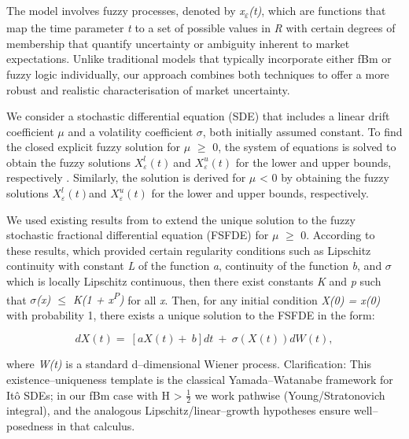\documentclass[12pt,a4paper]{report}
\numberwithin{equation}{section}
\begin{document}
The model involves fuzzy processes, denoted by
\emph{x\textsubscript{$\varepsilon$}(t)}, which are functions that map the time
parameter \emph{t} to a set of possible values in \emph{R} with certain
degrees of membership that quantify uncertainty or ambiguity inherent to
market expectations. Unlike traditional models that typically
incorporate either fBm or fuzzy logic individually, our approach
combines both techniques to offer a more robust and realistic
characterisation of market uncertainty.

We consider a stochastic differential equation (SDE) that includes a
linear drift coefficient \emph{$\mu$} and a volatility coefficient \emph{$\sigma$},
both initially assumed constant. To find the closed explicit fuzzy
solution for \emph{$\mu$} $\geq$ 0, the system of equations is solved to obtain
the fuzzy solutions \(X_{\varepsilon}^{l}(t)\ \)and
\(X_{\varepsilon}^{u}(t)\) for the lower and upper bounds, respectively
\cite{jafari2021fuzzy_81}. Similarly, the solution is derived for $\mu$ \textless{} 0 by
obtaining the fuzzy solutions \(X_{\varepsilon}^{l}(t)\)and
\(X_{\varepsilon}^{u}(t)\) for the lower and upper bounds, respectively.

We used existing results from \cite{llendeto2007modeling_82} \cite{bjrk2009arbitrage_89} to extend the unique
solution to the fuzzy stochastic fractional differential equation
(FSFDE) for \emph{$\mu$} $\geq$ 0. According to these results, which provided
certain regularity conditions such as Lipschitz continuity with constant
\emph{L} of the function \emph{a}, continuity of the function \emph{b},
and \emph{$\sigma$} which is locally Lipschitz continuous, then there exist
constants \emph{K} and \emph{p} such that
\emph{\textbar\textbar $\sigma$(x)\textbar\textbar{} $\leq$ K(1 +
\textbar\textbar x\textbar\textbar{}\textsuperscript{P})} for all
\emph{x}. Then, for any initial condition \emph{X(0) = x(0)} with
probability 1, there exists a unique solution to the FSFDE in the form:

\[dX(t) = \ \left\lbrack aX(t) + \ b \right\rbrack dt\  + \ \sigma\left( X(t) \right)dW(t),\]

where \emph{W(t)} is a standard d--dimensional Wiener process.
Clarification: This existence--uniqueness template is the classical
Yamada--Watanabe framework for Itô SDEs; in our fBm case with H
\textgreater{} $\frac{1}{2}$ \hspace{0pt} we work pathwise (Young/Stratonovich
integral), and the analogous Lipschitz/linear--growth hypotheses ensure
well--posedness in that calculus.
\end{document}
